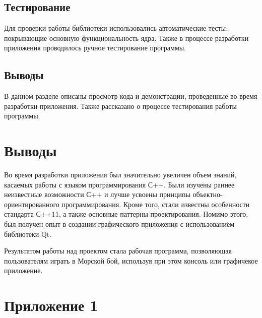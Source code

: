 \documentclass[a4paper]{article}
\begin{document}
\subsection{Тестирование}

Для проверки работы библиотеки использовались автоматические тесты, покрывающие основную функциональность ядра. Также в процессе разработки приложения проводилось ручное тестирование программы.

\subsection{Выводы}

В данном разделе описаны просмотр кода и демонстрации, проведенные во время разработки приложения. Также рассказано о процессе тестирования работы программы. 

\section{Выводы}

Во время разработки приложения был значительно увеличен объем знаний, касаемых работы с языком программирования С++. Были изучены раннее неизвестные возможности С++ и лучше усвоены принципы объектно-ориентированного программирования. Кроме того, стали известны особенности стандарта С++11, а также основные паттерны проектирования. Помимо этого, был получен опыт в создании графического приложения с использованием библиотеки Qt.  
 

Результатом работы над проектом стала рабочая программа, позволяющая пользователям играть в Морской бой, используя при этом консоль или графичекое приложение. 

\section{Приложение 1}


\parindent=1cm


\parindent=1cm


\parindent=1cm


\parindent=1cm


\parindent=1cm
\end{document}
